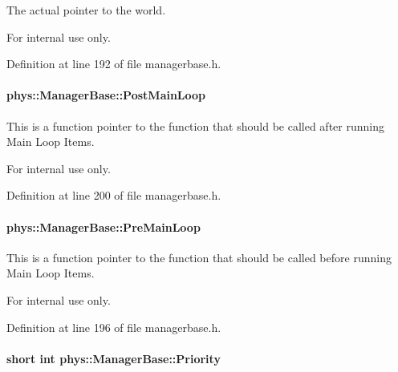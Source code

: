 The actual pointer to the world. 

\begin{DoxyInternal}{For internal use only.}
\end{DoxyInternal}


Definition at line 192 of file managerbase.h.

\hypertarget{classphys_1_1ManagerBase_aa1e80a30f151c07e06d1f4650f315da5}{
\paragraph[{PostMainLoop}]{ {\bf phys::ManagerBase::PostMainLoop}}\hfill}
\label{d2/de3/classphys_1_1ManagerBase_aa1e80a30f151c07e06d1f4650f315da5}


This is a function pointer to the function that should be called after running Main Loop Items. 

\begin{DoxyInternal}{For internal use only.}
\end{DoxyInternal}


Definition at line 200 of file managerbase.h.

\hypertarget{classphys_1_1ManagerBase_a93eb2f1a30d913a4e99180b0965eb5db}{
\paragraph[{PreMainLoop}]{ {\bf phys::ManagerBase::PreMainLoop}}\hfill}
\label{d2/de3/classphys_1_1ManagerBase_a93eb2f1a30d913a4e99180b0965eb5db}


This is a function pointer to the function that should be called before running Main Loop Items. 

\begin{DoxyInternal}{For internal use only.}
\end{DoxyInternal}


Definition at line 196 of file managerbase.h.

\hypertarget{classphys_1_1ManagerBase_a28e2690fbcf644a7780a53b81821d8ef}{
\paragraph[{Priority}]{\setlength{\rightskip}{0pt plus 5cm}short int {\bf phys::ManagerBase::Priority}}\hfill}
\label{d2/de3/classphys_1_1ManagerBase_a28e2690fbcf644a7780a53b81821d8ef}


